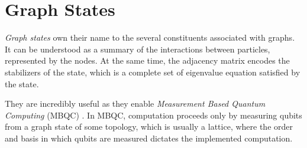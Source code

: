 \chapter{Graph States}
\label{Chap:graph_states}

\emph{Graph states} \cite{graph_state, rohde-graph-states} own their name to the several constituents associated with graphs.
It can be understood as a summary of the interactions between particles, represented by the nodes.
At the same time, the adjacency matrix encodes the stabilizers of the state, which is a complete set of eigenvalue equation satisfied by the state. 

They are incredibly useful as they enable \emph{Measurement Based Quantum Computing} (MBQC) \cite{MBQC}.
In MBQC, computation proceeds only by measuring qubits from a graph state of some topology, which is usually a lattice, where the order and basis in which qubits are measured dictates the implemented computation.



